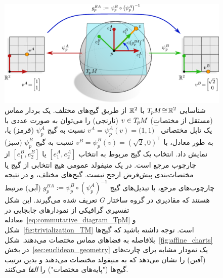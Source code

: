 \begin{figure}
	\centering
	\includegraphics[width=\columnwidth]{figures/gauges_TpM.pdf}
	\caption{\small
		شناسایی $T_{\mkern-1.5mu p}\mkern-.5muM\!\cong\!\mathbb{R}^2$ با $\mathbb{R}^2$ از طریق گیج‌های مختلف.
		یک بردار مماس (مستقل از مختصات) $v\in T_{\mkern-1.5mu p}\mkern-.5muM$ (نارنجی) را می‌توان به صورت عددی با یک تاپل مختصاتی $v^A=\psi_p^A(v)=\big(1,1\big)^\top$ نسبت به گیج $\psi_p^A$ (قرمز) یا، به طور معادل، با $v^B=\psi_p^B(v)=(\sqrt{2},0)^\top$ نسبت به گیج $\psi_p^B$ (سبز) نمایش داد.
		انتخاب یک گیج مربوط به انتخاب $[e_1^A,e_2^A]$ یا $[e_1^B,e_2^B]$ از چارچوب مرجع است.
		در یک منیفولد عمومی هیچ انتخابی از گیج یا مختصات‌بندی پیش‌فرض ارجح نیست.
		گیج‌های مختلف، و در نتیجه چارچوب‌های مرجع، با تبدیل‌های گیج $g_p^{BA}:=\psi_p^B\circ(\psi_p^A)^{-1}$ (آبی) مرتبط هستند که مقادیری در گروه ساختار $G$ تعریف شده می‌گیرند.
		این شکل تفسیری گرافیکی از نمودارهای جابجایی در معادله~\eqref{eq:commutative_diagram_TpM} و شکل~\ref{fig:trivialization_TM} است.
		توجه داشته باشید که گیج‌ها بلافاصله به فضاهای مماس مختصات می‌دهند.
		شکل~\ref{fig:affine_charts} در بخش~\ref{sec:euclidean_geometry} یک نمودار مشابه برای چارت‌های (آفین) را نشان می‌دهد که به منیفولد مختصات می‌دهند و بدین ترتیب گیج‌ها ("پایه‌های مختصات") را \emph{القا} می‌کنند.
	}
	\label{fig:gauge_trafos}
\end{figure}


